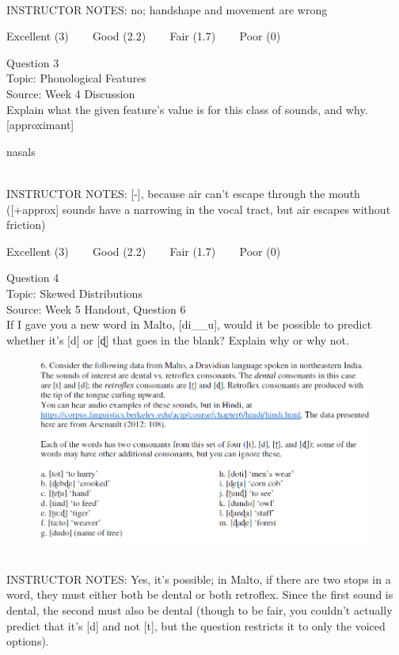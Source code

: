 \documentclass[12pt]{article}
\begin{document}
~\\
INSTRUCTOR NOTES: no; handshape and movement are wrong


\vfill
Excellent (3) ~~~ Good (2.2) ~~~ Fair (1.7) ~~~ Poor (0)
\newpage

{\large Question 3}\\

Topic: Phonological Features\\
Source: Week 4 Discussion\\

Explain what the given feature’s value is for this class of sounds, and why.\\

{[approximant]}

nasals


~\\
INSTRUCTOR NOTES: [-], because air can't escape through the mouth ([+approx] sounds have a narrowing in the vocal tract, but air escapes without friction)


\vfill
Excellent (3) ~~~ Good (2.2) ~~~ Fair (1.7) ~~~ Poor (0)
\newpage

{\large Question 4}\\

Topic: Skewed Distributions\\
Source: Week 5 Handout, Question 6\\

If I gave you a new word in Malto, [di\_\_u], would it be possible to predict whether it's [d] or [ɖ] that goes in the blank? Explain why or why not.\\

\begin{figure}[H]
\includegraphics{../images/malto.png}
\end{figure}

~\\
INSTRUCTOR NOTES: Yes, it's possible; in Malto, if there are two stops in a word, they must either both be dental or both retroflex. Since the first sound is dental, the second must also be dental (though to be fair, you couldn't actually predict that it's [d] and not [t], but the question restricts it to only the voiced options).
\end{document}
